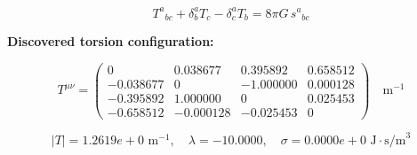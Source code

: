 
\begin{equation}
  T^a{}_{bc} + \delta^a_b T_c - \delta^a_c T_b = 8\pi G \, s^a{}_{bc}
\end{equation}

\textbf{Discovered torsion configuration:}

\begin{equation}
  T^{\mu\nu} = \begin{pmatrix}
    0 & 0.038677 & 0.395892 & 0.658512 \\
    -0.038677 & 0 & -1.000000 & 0.000128 \\
    -0.395892 & 1.000000 & 0 & 0.025453 \\
    -0.658512 & -0.000128 & -0.025453 & 0
  \end{pmatrix} \quad \text{m}^{-1}
\end{equation}

\begin{equation}
  |T| = 1.2619e+0 \text{ m}^{-1}, \quad
  \lambda = -10.0000, \quad
  \sigma = 0.0000e+0 \text{ J}\cdot\text{s/m}^3
\end{equation}